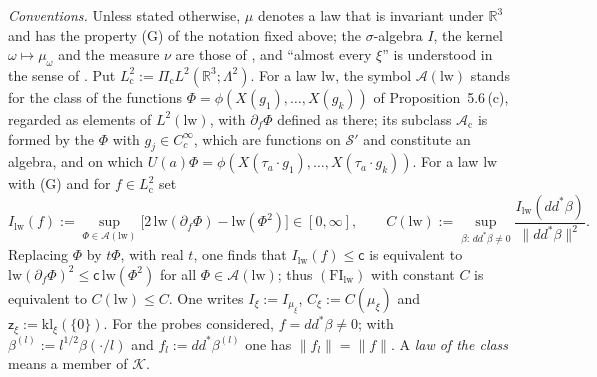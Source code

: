 \documentclass[11pt]{amsart}
\theoremstyle{definition}
\begin{document}
\emph{Conventions.}
Unless stated otherwise, $\mu$ denotes a law that is invariant under $\mathbb R^3$ and has the property (G) of the notation fixed above;
the $\sigma$-algebra $I$, the kernel $\omega\mapsto\mu_\omega$ and the measure $\nu$ are those of \cite[Proposition~45.6]{QEDIII}, and ``almost every $\xi$'' is understood in the sense of \cite[(n7)]{QEDIII}.
Put $L^2_{\mathrm c}:=\Pi_{\mathrm c}L^2(\mathbb R^3;\Lambda^2)$.
For a law $\mathrm{lw}$, the symbol $\mathcal A(\mathrm{lw})$ stands for the class of the functions $\Phi=\phi(X(g_1),\dots,X(g_k))$ of Proposition~5.6\,(c), regarded as elements of $L^2(\mathrm{lw})$, with $\partial_f\Phi$ defined as there;
its subclass $\mathcal A_{\mathrm c}$ is formed by the $\Phi$ with $g_j\in C_c^\infty$, which are functions on $\mathcal S'$ and constitute an algebra, and on which $U(a)\Phi=\phi(X(\tau_a\cdot g_1),\dots,X(\tau_a\cdot g_k))$.
For a law $\mathrm{lw}$ with (G) and for $f\in L^2_{\mathrm c}$ set
\begin{equation*}
I_{\mathrm{lw}}(f):=\sup_{\Phi\in\mathcal A(\mathrm{lw})}\bigl[2\,\mathrm{lw}(\partial_f\Phi)-\mathrm{lw}(\Phi^2)\bigr]\in[0,\infty],\qquad C(\mathrm{lw}):=\sup_{\beta:\,dd^*\beta\ne0}\frac{I_{\mathrm{lw}}(dd^*\beta)}{\|dd^*\beta\|^2}.
\end{equation*}
Replacing $\Phi$ by $t\Phi$, with real $t$, one finds that $I_{\mathrm{lw}}(f)\le\mathsf c$ is equivalent to $\mathrm{lw}(\partial_f\Phi)^2\le\mathsf c\,\mathrm{lw}(\Phi^2)$ for all $\Phi\in\mathcal A(\mathrm{lw})$;
thus $(\mathrm{FI}_{\mathrm{lw}})$ with constant $C$ is equivalent to $C(\mathrm{lw})\le C$.
One writes $I_\xi:=I_{\mu_\xi}$, $C_\xi:=C(\mu_\xi)$ and $\mathsf z_\xi:=\mathrm{kl}_\xi(\{0\})$.
For the probes considered, $f=dd^*\beta\ne0$;
with $\beta^{(l)}:=l^{1/2}\beta(\cdot/l)$ and $f_l:=dd^*\beta^{(l)}$ one has $\|f_l\|=\|f\|$.
A \emph{law of the class} means a member of $\mathcal K$.
\end{document}
